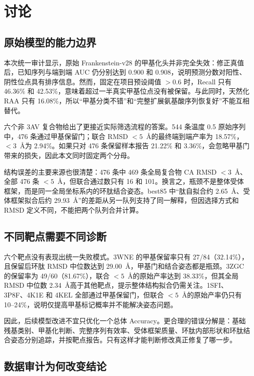 \section{讨论}

\subsection{原始模型的能力边界}

本次统一审计显示，原始 Frankenstein-v28 的甲基化头并非完全失效：修正真值后，已知序列与端到端 AUC 仍分别达到 0.900 和 0.908，说明预测分数对阳性、阴性位点具有排序信息。然而，固定在项目预设阈值 $>0.6$ 时，Recall 只有 46.36\% 和 42.53\%，意味着超过一半真实甲基位点没有被保留。与此同时，天然化 RAA 只有 16.08\%，所以“甲基分类不错”和“完整扩展氨基酸序列恢复好”不能互相替代。

六个非 3AV 复合物给出了更接近实际筛选流程的答案。544 条温度 0.5 原始序列中，476 条通过甲基保留门；联合 RMSD $<5$~\AA 的最终端到端产率为 18.57\%，$<3$~\AA 为 2.94\%。如果只对 476 条保留样本报告 21.22\% 和 3.36\%，会忽略甲基门带来的损失，因此本文同时固定两个分母。

结构误差的主要来源也很清楚：476 条中 469 条全局复合物 CA RMSD $<3$~\AA、全部 476 条 $<5$~\AA，但联合通过数只有 16 和 101。换言之，瓶颈不是整体受体框架，而是同一全局坐标系内的环肽结合姿态。best85 中“肽自拟合约 2.65~\AA、受体框架拟合后约 29.93~\AA”的差距从另一队列支持了同一解释，但因选择方式和 RMSD 定义不同，不能把两个队列合并计算。

\subsection{不同靶点需要不同诊断}

六个靶点没有表现出统一失败模式。3WNE 的甲基保留率只有 27/84（32.14\%），且保留后环肽 RMSD 中位数达到 29.00~\AA，甲基门和结合姿态都是瓶颈。3ZGC 的保留率为 49/60（81.67\%），联合 $<5$~\AA 的原始产率达到 38.33\%，但其全局 RMSD 中位数 2.34~\AA 高于其他靶点，提示整体结构拟合仍需关注。1SFI、3P8F、4K1E 和 4KEL 全部通过甲基保留门，但联合 $<5$~\AA 的原始产率仍只有 10--24\%，说明仅提高甲基标记概率并不能解决姿态问题。

因此，后续模型改进不宜只优化一个总体 Accuracy。更合理的错误分解是：基础残基类别、甲基化判断、完整序列有效率、受体框架质量、环肽内部形状和环肽结合姿态分别追踪，并按靶点报告。只有这样才能判断修改真正修复了哪一步。

\subsection{数据审计为何改变结论}

